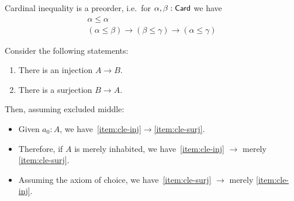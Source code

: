 \documentclass[hott-all.tex]{subfiles}
\begin{document}
% 
\begin{lem}
  Cardinal inequality is a preorder, i.e.\ for $\alpha,\beta:\mathsf{Card}$ we have
  \begin{gather*}
    \alpha \le \alpha\\
    (\alpha \le \beta) \to (\beta\le\gamma) \to (\alpha\le\gamma)
  \end{gather*}
\end{lem}
% 
% 
\begin{lem}
  Consider the following statements:
  \begin{enumerate}
  \item There is an injection $A\to B$.
  \item There is a surjection $B\to A$.
  \end{enumerate}
  Then, assuming excluded middle:
  \begin{itemize}
  \item Given $a_0:A$, we have~\ref{item:cle-inj}$\to$\ref{item:cle-surj}.
  \item Therefore, if $A$ is merely inhabited, we have~\ref{item:cle-inj} $\to$ merely \ref{item:cle-surj}.
  \item Assuming the axiom of choice, we have~\ref{item:cle-surj} $\to$ merely \ref{item:cle-inj}.
  \end{itemize}
\end{lem}
\end{document}
